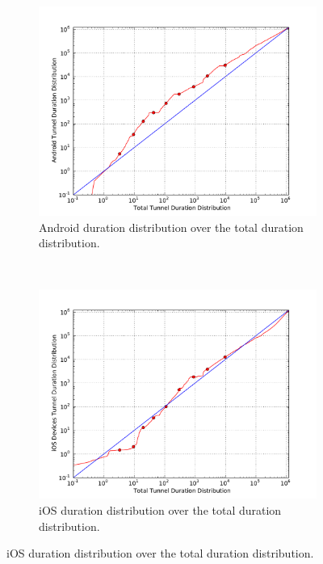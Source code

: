 \begin{figure}
        \centering
        \begin{subfigure}[b]{0.50\textwidth}
                \centering
                \includegraphics[width=\textwidth]{images/qq-total-vs-android.pdf}
                \caption{Android duration distribution over the total duration distribution.}
                \label{fig:qq-total-vs-android}
        \end{subfigure}%
        ~
        \begin{subfigure}[b]{0.50\textwidth}
                        \centering
                \includegraphics[width=\textwidth]{images/qq-total-vs-ios.pdf}
                \caption{iOS duration distribution over the total duration distribution.}
                \label{fig:qq-total-vs-ios}
        \end{subfigure}


\end{figure}
